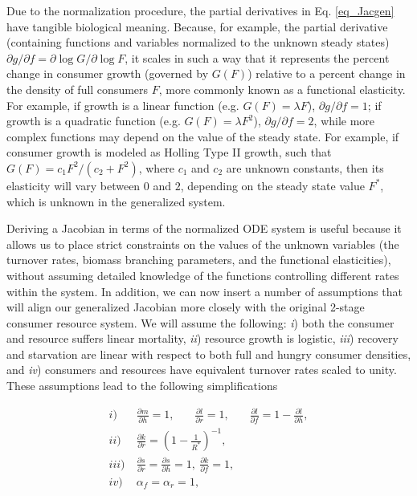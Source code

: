 \documentclass[12pt,english]{article}
\begin{document}
\begin{spacing}{1.9}
Due to the normalization procedure, the partial derivatives in Eq. \ref{eq_Jacgen} have tangible biological meaning.
Because, for example, the partial derivative (containing functions and variables normalized to the unknown steady states) $\partial g / \partial f = \partial \log G / \partial \log F$, it scales in such a way that it represents the percent change in consumer growth (governed by $G(F)$) relative to a percent change in the density of full consumers $F$, more commonly known as a functional elasticity.
For example, if growth is a linear function (e.g. $G(F) = \lambda F$), $\partial g / \partial f = 1$; if growth is a quadratic function (e.g. $G(F) = \lambda F^2$), $\partial g / \partial f = 2$, while more complex functions may depend on the value of the steady state.
For example, if consumer growth is modeled as Holling Type II growth, such that $G(F) = c_1 F^2/(c_2 + F^2)$, where $c_1$ and $c_2$ are unknown constants, then its elasticity will vary between $0$ and $2$, depending on the steady state value $F^*$, which is unknown in the generalized system.

Deriving a Jacobian in terms of the normalized ODE system is useful because it allows us to place strict constraints on the values of the unknown variables (the turnover rates, biomass branching parameters, and the functional elasticities), without assuming detailed knowledge of the functions controlling different rates within the system. %
In addition, we can now insert a number of assumptions that will align our generalized Jacobian more closely with the original 2-stage consumer resource system.
We will assume the following:
\emph{i}) both the consumer and resource suffers linear mortality,
\emph{ii}) resource growth is logistic,
\emph{iii}) recovery and starvation are linear with respect to both full and hungry consumer densities, and
\emph{iv}) consumers and resources have equivalent turnover rates scaled to unity.
These assumptions lead to the following simplifications

\begin{align}
	i)~&\frac{\partial m}{\partial h} = 1, ~~~~~~~~ \frac{\partial l}{\partial r} = 1, ~~~~~~~~ \frac{\partial l}{\partial f} = 1 - \frac{\partial l}{\partial h}, \nonumber \\
	ii)~&\frac{\partial k}{\partial r} = \left(1 - \frac{1}{R^*} \right)^{-1}, \nonumber \\
	iii)~&\frac{\partial s}{\partial r} = \frac{\partial s}{\partial h} = 1, ~ \frac{\partial k}{\partial f} = 1, \nonumber \\
	iv)~&\alpha_f = \alpha_r = 1,
\end{align}


\end{spacing}
\end{document}
